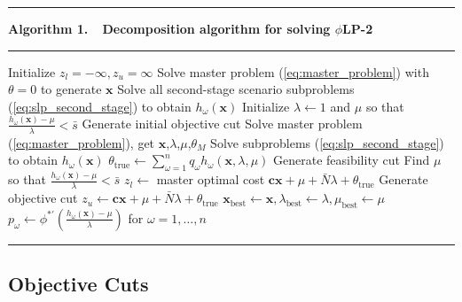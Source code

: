 \documentclass[opre,nonblindrev]{informs3} %
\newcommand{\x}{\mathbf{x}}
\renewcommand{\c}{\mathbf{c}}
\newcommand{\plp}{$\phi$LP-2}
\begin{document}
\begin{center}
\begin{minipage}{.61\textwidth}
	\TableSpaced
	\hrule
	\vspace{1pt}
    {\bf \small Algorithm 1.\ \ Decomposition algorithm for solving \plp}
	\hrule
	\vspace{1pt}
	\begin{algorithmic}
		\State Initialize $z_l = -\infty, z_u = \infty$
		\State Solve master problem (\ref{eq:master_problem}) with $\theta = 0$ to generate $\x$
		\State Solve all second-stage scenario subproblems (\ref{eq:slp_second_stage}) to obtain $h_\omega(\x)$
		\State Initialize $\lambda \gets 1$ and $\mu$ so that $\frac{h_\omega(\x) - \mu}{\lambda} < \bar{s}$
		\State Generate initial objective cut
			\State Solve master problem (\ref{eq:master_problem}), get $\x$,$\lambda$,$\mu$,$\theta_M$
			\State Solve subproblems (\ref{eq:slp_second_stage}) to obtain  $h_\omega(\x)$
			\State $\theta_{\text{true}} \gets \sum_{\omega=1}^n q_\omega h_\omega(\x,\lambda,\mu)$
			\If{$\frac{h_\omega(\x) - \mu}{\lambda} > \bar{s}$}
				\State Generate feasibility cut
				\State Find $\mu$ so that $\frac{h_\omega(\x) - \mu}{\lambda} < \bar{s}$
			\Else
				\State $z_l \gets$ master optimal cost $\c\x + \mu + \bar{N}\lambda + \theta_{\text{true}}$
			\EndIf
			\State Generate objective cut
			\If{$\c\x + \mu + \bar{N}\lambda + \theta_{\text{true}} < z_u$}
				\State $z_u \gets \c\x + \mu + \bar{N}\lambda + \theta_{\text{true}}$
				\State $\x_\text{best} \gets \x, \lambda_\text{best} \gets \lambda, \mu_\text{best} \gets \mu$
				\State $p_\omega \gets \phi^{*\prime}(\tfrac{h_\omega(\x) - \mu}{\lambda})$ for $\omega = 1, \dots, n$
			\EndIf
		\EndWhile
	\end{algorithmic}
	\hrule
\end{minipage}
\end{center}


\subsection{Objective Cuts}
\end{document}
